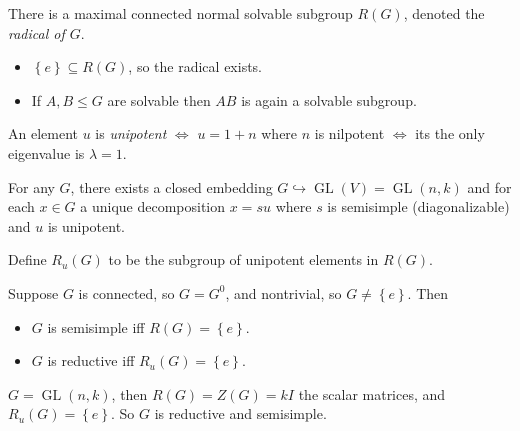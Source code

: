 \begin{proposition}

There is a maximal connected normal solvable subgroup \(R(G)\), denoted
the \emph{radical of \(G\)}.

\begin{itemize}
\tightlist
\item
  \(\left\{{e}\right\} \subseteq R(G)\), so the radical exists.
\item
  If \(A, B \leq G\) are solvable then \(AB\) is again a solvable
  subgroup.
\end{itemize}

\end{proposition}

\begin{definition}[Unipotent]

An element \(u\) is \emph{unipotent} \(\iff\) \(u = 1+n\) where \(n\) is
nilpotent \(\iff\) its the only eigenvalue is \(\lambda = 1\).

\end{definition}

\begin{proposition}[JC Decomposition]

For any \(G\), there exists a closed embedding
\(G\hookrightarrow\operatorname{GL}(V) = \operatorname{GL}(n , k)\) and
for each \(x\in G\) a unique decomposition \(x=su\) where \(s\) is
semisimple (diagonalizable) and \(u\) is unipotent.

\end{proposition}

Define \(R_u(G)\) to be the subgroup of unipotent elements in \(R(G)\).

\begin{definition}

\hfill

Suppose \(G\) is connected, so \(G = G^0\), and nontrivial, so
\(G\neq \left\{{e}\right\}\). Then

\begin{itemize}
\tightlist
\item
  \(G\) is semisimple iff \(R(G) = \left\{{e}\right\}\).
\item
  \(G\) is reductive iff \(R_u(G) = \left\{{e}\right\}\).
\end{itemize}

\end{definition}

\begin{example}

\(G = \operatorname{GL}(n, k)\), then \(R(G) = Z(G) = kI\) the scalar
matrices, and \(R_u(G) = \left\{{e}\right\}\). So \(G\) is reductive and
semisimple.

\end{example}

